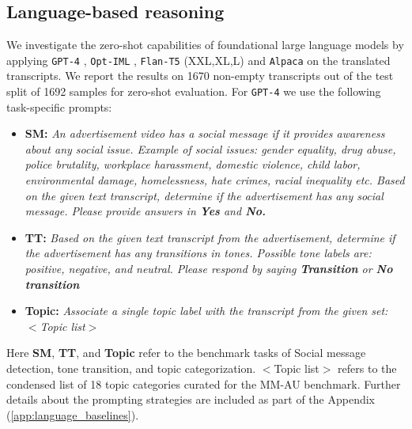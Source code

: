  \subsection{Language-based reasoning}
We investigate the zero-shot capabilities of foundational large language models \cite{Zhao2023ASO} by applying \texttt{GPT-4} \cite{OpenAI2023GPT4TR}, \texttt{Opt-IML} \cite{Iyer2022OPTIMLSL}, \texttt{Flan-T5} (XXL,XL,L) \cite{Chung2022ScalingIL} and \texttt{Alpaca} \cite{alpaca} on the translated transcripts. We report the results on 1670 non-empty transcripts out of the test split of 1692 samples for zero-shot evaluation. For \texttt{GPT-4} we use the following task-specific prompts:
\begin{itemize}
    \item \textbf{SM:} \textit{An advertisement video has a social message if it provides awareness about any social issue. Example of social issues: gender equality, drug abuse, police brutality, workplace harassment, domestic violence, child labor, environmental damage, homelessness, hate crimes, racial inequality etc. Based on the given text transcript, determine if the advertisement has any social message. Please provide answers in \textbf{Yes} and \textbf{No.}}
    \item \textbf{TT:} \textit{Based on the given text transcript from the advertisement, determine if the advertisement has any transitions in tones. Possible tone labels are: positive, negative, and neutral. Please respond by saying \textbf{Transition} or \textbf{No transition}}
    \item \textbf{Topic:} \textit{Associate a single topic label with the transcript from the given set: $<$Topic list$>$}
\end{itemize}
Here \textbf{SM}, \textbf{TT}, and \textbf{Topic} refer to the benchmark tasks of Social message detection, tone transition, and topic categorization. $<$Topic list$>$ refers to the condensed list of 18 topic categories curated for the MM-AU benchmark. Further details about the prompting strategies are included as part of the Appendix (\ref{app:language_baselines}).
